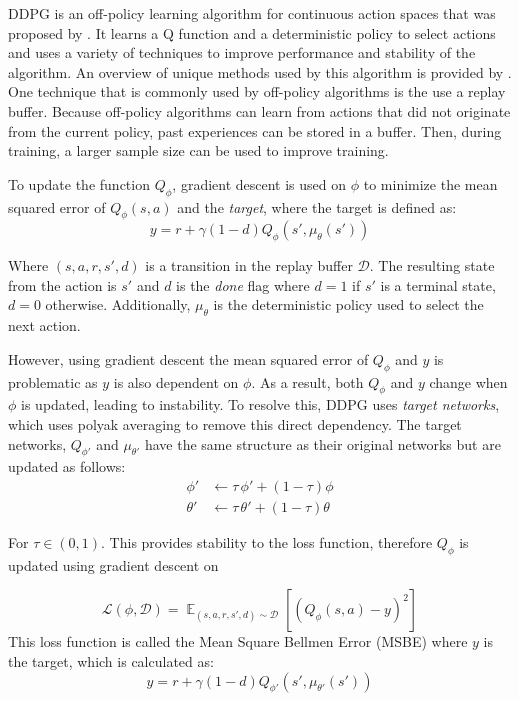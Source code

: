 \documentclass[conference]{IEEEtran}
\begin{document}
DDPG is an off-policy learning algorithm for continuous action spaces that was proposed by \cite{DDPG}. It learns a Q function and a deterministic policy to select actions and uses a variety of techniques to improve performance and stability of the algorithm. An overview of unique methods used by this algorithm is provided by \cite{spinning_up_ddpg}. One technique that is commonly used by off-policy algorithms is the use a replay buffer. Because off-policy algorithms can learn from actions that did not originate from the current policy, past experiences can be stored in a buffer. Then, during training, a larger sample size can be used to improve training.

To update the function $Q_\phi$, gradient descent is used on $\phi$ to minimize the mean squared error of $Q_\phi(s, a)$ and the \textit{target}, where the target is defined as:
$$
    y = r + \gamma(1-d)Q_\phi(s', \mu_\theta(s'))
$$

Where $(s, a, r, s', d)$ is a transition in the replay buffer $\mathcal{D}$. The resulting state from the action is $s'$ and $d$ is the \textit{done} flag where $d=1$ if $s'$ is a terminal state, $d=0$ otherwise. Additionally, $\mu_\theta$ is the deterministic policy used to select the next action.

However, using gradient descent the mean squared error of $Q_\phi$ and $y$ is problematic as $y$ is also dependent on $\phi$. As a result, both $Q_\phi$ and $y$ change when $\phi$ is updated, leading to instability. To resolve this, DDPG uses \textit{target networks}, which uses polyak averaging to remove this direct dependency. The target networks, $Q_{\phi'}$ and $\mu_{\theta'}$ have the same structure as their original networks but are updated as follows:
\begin{align*}
    \phi'   & \leftarrow \tau \, \phi' + (1 - \tau) \phi     \\
    \theta' & \leftarrow \tau \, \theta' + (1 - \tau) \theta
\end{align*}

\begin{flushleft}
    For $\tau \in (0, 1)$. This provides stability to the loss function, therefore $Q_\phi$ is updated using gradient descent on
\end{flushleft}

$$
    \mathcal{L}(\phi, \mathcal{D}) = \mathop{\mathbb{E}}_{(s,a,r,s',d) \sim \mathcal{D}}\left[\left(Q_\phi(s,a) - y\right)^2\right]
$$
This loss function is called the Mean Square Bellmen Error (MSBE) where $y$ is the target, which is calculated as:
$$
    y = r + \gamma(1-d)Q_{\phi'}(s', \mu_{\theta'}(s'))
$$
\end{document}
